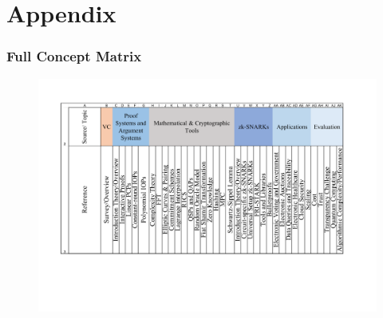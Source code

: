 \appendix

\chapter{Appendix}
\subsection*{Full Concept Matrix} \label{Appendix A}
\begin{figure}[H]
	\centering
		\includegraphics[width=1.0\textwidth]{Pictures/concept_matrix/wos-01.png}
\end{figure}

